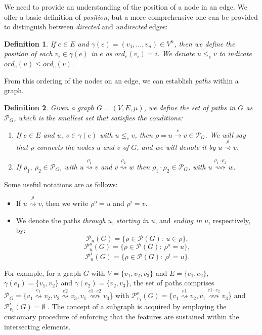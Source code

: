\documentclass[mathematics,article,submit,pdftex,moreauthors]{Definitions/mdpi}
\newtheorem{definition}{Definition}[section]
\begin{document}
We need to provide an understanding of the position of a node in an edge. We offer a basic definition of \textit{position}, but a more comprehensive one can be provided to distinguish between \textit{directed} and \textit{undirected} edges:

\begin{definition}{}
If $e\in E$ and $\gamma(e)=(v_1,\dots,v_n)\in V^n$, then we define the \emph{position} of each $v_i\in \gamma(e)$ in $e$ as $ord_e(v_i)=i$. We denote $u\leq_e v$ to indicate $ord_e(u)\leq ord_e(v)$.
\end{definition}

From this ordering of the nodes on an edge, we can establish \textit{paths} within a graph.

\begin{definition}{}
Given a graph $G=(V,E,\mu)$, we define the set of \emph{paths} in $G$ as $\mathcal{P}_G$, which is the smallest set that satisfies the conditions:
\begin{enumerate}
    \item If $e\in E$ and $u,\ v\in \gamma (e)$ with $u \leq_e v$, then $\rho=u \stackrel{e}{\rightarrow} v\in \mathcal{P}_G$. We will say that $\rho$ \emph{connects} the nodes $u$ and $v$ of $G$, and we will denote it by $u \stackrel{\rho}{\rightsquigarrow} v$.
    \item If $\rho_1,\ \rho_2\in \mathcal{P}_G$, with $u \stackrel{\rho_1}{\rightsquigarrow} v$ and $v \stackrel{\rho_2}{\rightsquigarrow} w$ then $\rho_1\cdot\rho_2 \in \mathcal{P}_G$, with $u \stackrel{\rho_1\cdot\rho_2}{\rightsquigarrow} w$.
\end{enumerate}
\end{definition}\medskip

Some useful notations are as follows:
	\begin{itemize}
	\item If $u \stackrel{\rho}{\rightsquigarrow} v$, then we write $\rho^o=u$ and $\rho^i=v$.
	\item We denote the paths \textit{through} $u$, \textit{starting in} $u$, and \textit{ending in} $ u$, respectively, by:
	$$\mathcal{P}_u(G)=\{\rho \in \mathcal{P}(G):\ u\in \rho\},$$
	$$\mathcal{P}_u^o(G)=\{\rho \in \mathcal{P}(G):\ \rho^o=u\},$$
	$$\mathcal{P}_u^i(G)=\{\rho \in \mathcal{P}(G):\ \rho^i=u\}.$$
\end{itemize}
For example, for a graph $G$ with $V=\{v_1,v_2,v_3\}$ and $E=\{e_1,e_2\}$, $\gamma(e_1) = \{v_1,v_2\}$ and $\gamma(e_2) = \{v_2,v_3\}$, the set of paths comprises $ \mathcal{P}_G = \{ v_1 \stackrel{e_1}{\rightsquigarrow}  v_2,v_2 \stackrel{e2}{\rightsquigarrow}  v_3,v_1 \stackrel{e1\cdot e2}{\rightsquigarrow}  v_3$\} with $\mathcal{P}^o_{v_1}(G)=\{ v_1 \stackrel{e1}{\rightsquigarrow}  v_2,v_1 \stackrel{e1\cdot e_2}{\rightsquigarrow}  v_3$\} and  $\mathcal{P}^i_{v_1}(G)=\emptyset$ .
The concept of a subgraph is acquired by employing the customary procedure of enforcing that the features are sustained within the intersecting elements.
\end{document}
